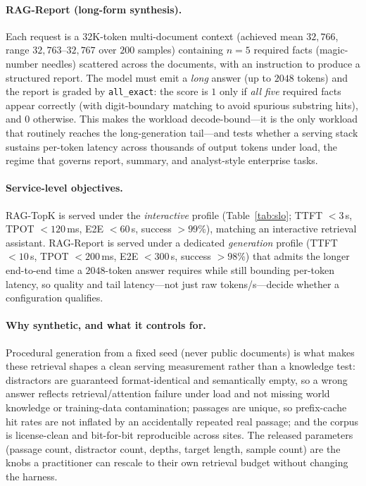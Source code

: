 \paragraph{RAG-Report (long-form synthesis).}
Each request is a 32K-token multi-document context (achieved mean $32{,}766$, range
$32{,}763$--$32{,}767$ over $200$ samples) containing $n{=}5$ required facts
(magic-number needles) scattered across the documents, with an instruction to
produce a structured report. The model must emit a \emph{long} answer (up to
$2048$ tokens) and the report is graded by \texttt{all\_exact}: the score is $1$
only if \emph{all five} required facts appear correctly (with digit-boundary
matching to avoid spurious substring hits), and $0$ otherwise. This makes the
workload decode-bound---it is the only workload that routinely reaches the
long-generation tail---and tests whether a serving stack sustains per-token latency
across thousands of output tokens under load, the regime that governs report,
summary, and analyst-style enterprise tasks.

\paragraph{Service-level objectives.}
RAG-TopK is served under the \emph{interactive} profile
(Table~\ref{tab:slo}; TTFT $<3$\,s, TPOT $<120$\,ms, E2E $<60$\,s, success $>99\%$),
matching an interactive retrieval assistant. RAG-Report is served under a dedicated
\emph{generation} profile (TTFT $<10$\,s, TPOT $<200$\,ms, E2E $<300$\,s,
success $>98\%$) that admits the longer end-to-end time a $2048$-token answer
requires while still bounding per-token latency, so quality and tail latency---not
just raw tokens/s---decide whether a configuration qualifies.

\paragraph{Why synthetic, and what it controls for.}
Procedural generation from a fixed seed (never public documents) is what makes these
retrieval shapes a clean serving measurement rather than a knowledge test:
distractors are guaranteed format-identical and semantically empty, so a wrong
answer reflects retrieval/attention failure under load and not missing world
knowledge or training-data contamination; passages are unique, so prefix-cache hit
rates are not inflated by an accidentally repeated real passage; and the corpus is
license-clean and bit-for-bit reproducible across sites. The released parameters
(passage count, distractor count, depths, target length, sample count) are the knobs
a practitioner can rescale to their own retrieval budget without changing the harness.

